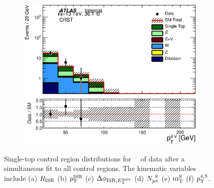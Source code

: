 \begin{figure}[h!]
\begin{center}
\begin{subfigure}[b]{0.40\textwidth}
    	 \includegraphics[width=\textwidth]{figures/plotRegion/CA_pTjV4_CRST_log.eps}
               \caption{ }
    \end{subfigure}
     \caption[~Single-top control region distributions for \intlumi\ \ifb\ of data after a simultaneous fit to all control regions.]{ Single-top control region distributions for \intlumi\ \ifb\ of data after a simultaneous fit to all control regions. The kinematic variables include (a) $R_{\mathrm{ISR}}$ (b) $p_{\mathrm{T}}^{\mathrm{ISR}}$ (c) $\Delta\phi_{\mathrm{ISR},E_{\mathrm{T}}^{\mathrm{miss}}}$ (d) $N_{\mathrm{jet}}^{~\mathrm{S}}$ (e) $m_{\mathrm{T}}^{\mathrm{S}}$ (f) $p_{\mathrm{T}}^{4,\mathrm{S}}$.  }%
     
  \label{fig:CRST1}
    \end{center}
\end{figure}

\pagebreak



